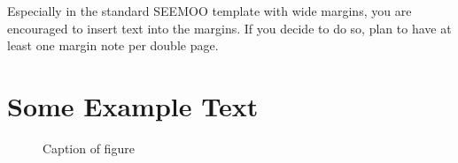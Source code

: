 Especially in the standard SEEMOO template with wide margins, you are
 encouraged to insert text into the
margins. If you decide to do so, plan to have at least one margin note
per double page.

\section{Some Example Text}
\lipsum[3]

\begin{figure}
\centering
\setlength\figureheight{5cm}
\setlength{}

\caption[Caption for list of figures]{Caption of figure}
\label{fig:example}
\end{figure}

\lipsum[6-10]
